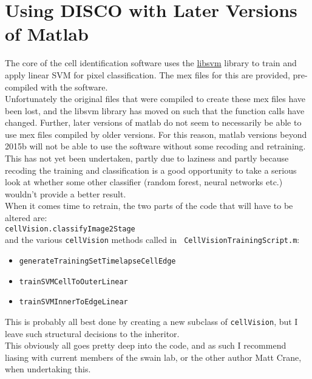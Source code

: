 \section{Using DISCO with Later Versions of Matlab}
\label{sec:other_matlabs}

The core of the cell identification software uses the \href{https://github.com/cjlin1/libsvm}{libsvm} library to train and apply linear SVM for pixel classification. The mex files for this are provided, pre-compiled with the software. \\
Unfortunately the original files that were compiled to create these mex files have been lost, and the libsvm library has moved on such that the function calls have changed. Further, later versions of matlab do not seem to necessarily be able to use mex files compiled by older versions. For this reason, matlab versions beyond 2015b will not be able to use the software without some recoding and retraining.\\
This has not yet been undertaken, partly due to laziness and partly because recoding the training and classification is a good opportunity to take a serious look at whether some other classifier (random forest, neural networks etc.) wouldn't provide a better result. \\
When it comes time to retrain, the two parts of the code that will have to be altered are:\\ \texttt{cellVision.classifyImage2Stage}\\
 and the various \texttt{cellVision} methods called in \texttt{ CellVisionTrainingScript.m}:
 \begin{itemize} 
 \item \texttt{generateTrainingSetTimelapseCellEdge}
 \item \texttt{trainSVMCellToOuterLinear} 
 \item \texttt{trainSVMInnerToEdgeLinear} 
\end{itemize}
This is probably all best done by creating a new subclass of \texttt{cellVision}, but I leave such structural decisions to the inheritor.
\vspace*{1cm}
\\This obviously all goes pretty deep into the code, and as such I recommend liasing with current members of the swain lab, or the other author Matt Crane, when undertaking this.